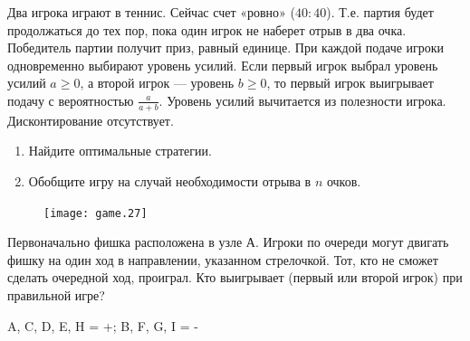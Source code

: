 \begin{problem}
\begin{source}
\cite{lones:dtc}\end{source}
Два игрока играют в теннис. Сейчас счет «ровно» ($40:40$). Т.е. партия будет продолжаться до тех пор, пока один игрок не наберет отрыв в два очка. Победитель партии получит приз, равный единице. При каждой подаче игроки одновременно выбирают уровень усилий. Если первый игрок выбрал уровень усилий $a\ge 0$, а второй игрок — уровень $b\ge 0$, то первый игрок выигрывает подачу с вероятностью $\frac{a}{a+b}$. Уровень усилий вычитается из полезности игрока. Дисконтирование отсутствует. \par
\begin{enumerate}
\item  Найдите оптимальные стратегии. \par
\item Обобщите игру на случай необходимости отрыва в $n$ очков. \par
\end{enumerate}




\begin{sol}

\end{sol}
\end{problem}



\begin{problem}
\begin{figure}[htbp]
     \texttt{[image: game.27]}
\end{figure}
Первоначально фишка расположена в узле А. Игроки по очереди могут двигать фишку на один ход в направлении, указанном стрелочкой. Тот, кто не сможет сделать очередной ход, проиграл. Кто выигрывает (первый или второй игрок) при правильной игре?

\begin{sol}
 A, C, D, E, H = +; B, F, G, I = -
\end{sol}
\end{problem}



